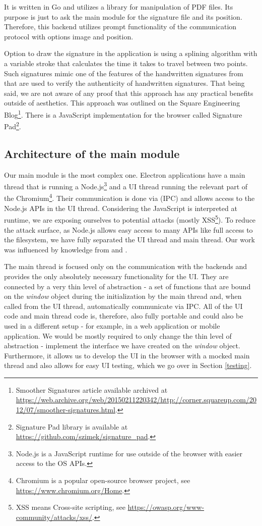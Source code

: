 \documentclass[thesismargins, english, thesislinespacing, onelinechapterstyle, upjsfrontpage]{rnthesis}
\begin{document}
It is written in Go and utilizes a library for manipulation of PDF files.
Its purpose is just to ask the main module for the signature file and its position.
Therefore, this backend utilizes prompt functionality of the communication protocol with options image and position.

Option to draw the signature in the application is using a splining algorithm with a variable stroke that calculates the time it takes to travel between two points.
Such signatures mimic one of the features of the handwritten signatures from \cite{verification} that are used to verify the authenticity of handwritten signatures.
That being said, we are not aware of any proof that this approach has any practical benefits outside of aesthetics.
This approach was outlined on the Square Engineering Blog\footnote{Smoother Signatures article available archived at \url{https://web.archive.org/web/20150211220342/http://corner.squareup.com/2012/07/smoother-signatures.html}.}.
There is a JavaScript implementation for the browser called Signature Pad\footnote{Signature Pad library is available at \url{https://github.com/szimek/signature_pad}.}.

\subsection{Architecture of the main module} \label{architecture}

Our main module is the most complex one.
Electron applications have a main thread that is running a Node.js\footnote{Node.js is a JavaScript runtime for use outside of the browser with easier access to the OS APIs.} and a UI thread running the relevant part of the Chromium\footnote{Chromium is a popular open-source browser project, see \url{https://www.chromium.org/Home}.}.
Their communication is done via  (IPC) and allows access to the Node.js APIs in the UI thread.
Considering the JavaScript is interpreted at runtime, we are exposing ourselves to potential attacks (mostly XSS\footnote{XSS means Cross-site scripting, see \url{https://owasp.org/www-community/attacks/xss/}.}).
To reduce the attack surface, as Node.js allows easy access to many APIs like full access to the filesystem, we have fully separated the UI thread and main thread.
Our work was influenced by knowledge from \cite{eloquentjs} and \cite{ydkjs}.

The main thread is focused only on the communication with the backends and provides the only absolutely necessary functionality for the UI.
They are connected by a very thin level of abstraction - a set of functions that are bound on the \textit{window} object during the initialization by the main thread and, when called from the UI thread, automatically communicate via IPC.
All of the UI code and main thread code is, therefore, also fully portable and could also be used in a different setup - for example, in a web application or mobile application.
We would be mostly required to only change the thin level of abstraction - implement the interface we have created on the \textit{window} object.
Furthermore, it allows us to develop the UI in the browser with a mocked main thread and also allows for easy UI testing, which we go over in Section \ref{testing}.
\end{document}
